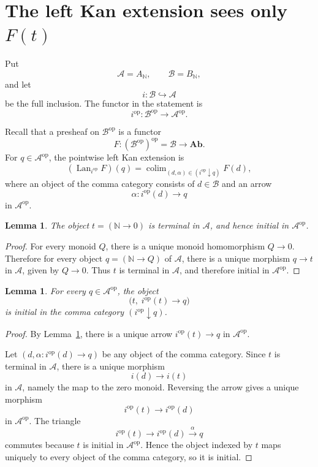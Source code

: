 \documentclass[11pt]{article}
\newtheorem{lemma}[theorem]{Lemma}
\theoremstyle{definition}
\theoremstyle{remark}
\newcommand{\op}{{\mathrm{op}}}
\newcommand{\Lan}{\operatorname{Lan}}
\newcommand{\colim}{\operatorname{colim}}
\newcommand{\N}{\mathbb N}
\begin{document}
\section{The left Kan extension sees only \(F(t)\)}

Put
\[
\mathcal A=A_{\N},\qquad \mathcal B=B_{\N},
\]
and let
\[
i\colon \mathcal B\hookrightarrow \mathcal A
\]
be the full inclusion.  The functor in the statement is
\[
i^\op\colon\mathcal B^\op\longrightarrow\mathcal A^\op.
\]

Recall that a presheaf on \(\mathcal B^\op\) is a functor
\[
F\colon(\mathcal B^\op)^\op=\mathcal B\longrightarrow \mathbf{Ab}.
\]
For \(q\in\mathcal A^\op\), the pointwise left Kan extension is
\[
(\Lan_{i^\op}F)(q)
=
\colim_{(d,\alpha)\in(i^\op\downarrow q)}F(d),
\]
where an object of the comma category consists of \(d\in\mathcal B\)
and an arrow
\[
\alpha\colon i^\op(d)\longrightarrow q
\]
in \(\mathcal A^\op\).

\begin{lemma}\label{lem:terminal}
The object \(t=(\N\to0)\) is terminal in \(\mathcal A\), and hence
initial in \(\mathcal A^\op\).
\end{lemma}

\begin{proof}
For every monoid \(Q\), there is a unique monoid homomorphism
\(Q\to0\).  Therefore for every object \(q=(\N\to Q)\) of
\(\mathcal A\), there is a unique morphism \(q\to t\) in
\(\mathcal A\), given by \(Q\to0\).  Thus \(t\) is terminal in
\(\mathcal A\), and therefore initial in \(\mathcal A^\op\).
\end{proof}

\begin{lemma}\label{lem:initial-comma}
For every \(q\in\mathcal A^\op\), the object
\[
\bigl(t,\;i^\op(t)\to q\bigr)
\]
is initial in the comma category \((i^\op\downarrow q)\).
\end{lemma}

\begin{proof}
By Lemma~\ref{lem:terminal}, there is a unique arrow
\(i^\op(t)\to q\) in \(\mathcal A^\op\).

Let \((d,\alpha\colon i^\op(d)\to q)\) be any object of the comma
category.  Since \(t\) is terminal in \(\mathcal A\), there is a
unique morphism
\[
i(d)\longrightarrow i(t)
\]
in \(\mathcal A\), namely the map to the zero monoid.  Reversing the
arrow gives a unique morphism
\[
i^\op(t)\longrightarrow i^\op(d)
\]
in \(\mathcal A^\op\).  The triangle
\[
i^\op(t)\longrightarrow i^\op(d)\xrightarrow{\alpha}q
\]
commutes because \(t\) is initial in \(\mathcal A^\op\).  Hence the
object indexed by \(t\) maps uniquely to every object of the comma
category, so it is initial.
\end{proof}
\end{document}
